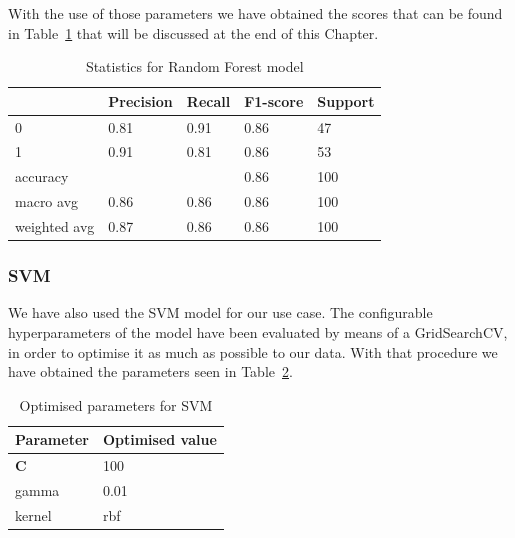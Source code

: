 With the use of those parameters we have obtained the scores that can be found in Table~\ref{tab:RandomForestStatistics} that will be discussed at the end of this Chapter.

\begin{table}[htp]
\centering
\begin{tabular}{|l|l|l|l|l|}
\hline
\textbf{}    & \textbf{Precision} & \textbf{Recall} & \textbf{F1-score} & \textbf{Support} \\ \hline
0            & 0.81               & 0.91            & 0.86              & 47               \\ \hline
1            & 0.91               & 0.81            & 0.86              & 53               \\ \hline
accuracy     &                    &                 & 0.86              &  100             \\ \hline
macro avg    & 0.86               & 0.86            & 0.86              & 100              \\ \hline
weighted avg & 0.87               & 0.86            & 0.86              & 100              \\ \hline
\end{tabular}
\caption{Statistics for Random Forest model}
\label{tab:RandomForestStatistics}
\end{table}

\subsubsection{SVM}
We have also used the SVM model for our use case. The configurable hyperparameters of the model have been evaluated by means of a GridSearchCV, in order to optimise it as much as possible to our data. With that procedure we have obtained the parameters seen in Table~\ref{tab:SVMoptimisedparams}.

\begin{table}[h]
\centering
\begin{tabular}{|l|l|}
\hline
\textbf{Parameter} & \textbf{Optimised value} \\ \hline
\textbf{C}         & 100                      \\ \hline
gamma              & 0.01                     \\ \hline
kernel             & rbf                      \\ \hline
\end{tabular}
\caption{Optimised parameters for SVM}
\label{tab:SVMoptimisedparams}
\end{table}


